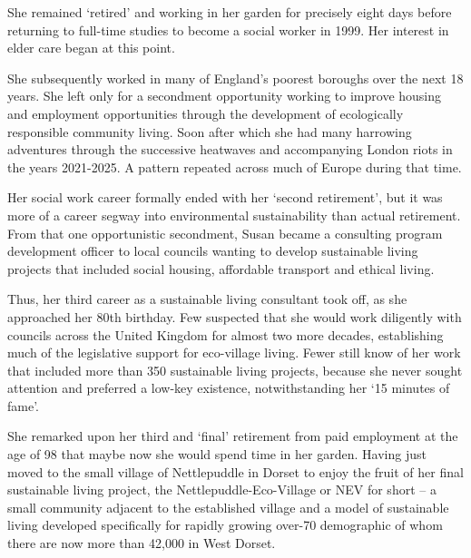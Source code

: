 She remained `retired' and working in her garden for precisely eight days before returning to full-time studies to become a social worker in 1999. Her interest in elder care began at this point.

She subsequently worked in many of England's poorest boroughs over the next 18 years. She left only for a secondment opportunity working to improve housing and employment opportunities through the development of ecologically responsible community living. Soon after which she had many harrowing adventures through the successive heatwaves and accompanying London riots in the years 2021-2025. A pattern repeated across much of Europe during that time.

Her social work career formally ended with her `second retirement', but it was more of a career segway into environmental sustainability than actual retirement. From that one opportunistic secondment, Susan became a consulting program development officer to local councils wanting to develop sustainable living projects that included social housing, affordable transport and ethical living.

Thus, her third career as a sustainable living consultant took off, as she approached her 80th birthday. Few suspected that she would work diligently with councils across the United Kingdom for almost two more decades, establishing much of the legislative support for eco-village living. Fewer still know of her work that included more than 350 sustainable living projects, because she never sought attention and preferred a low-key existence, notwithstanding her `15 minutes of fame'.

She remarked upon her third and `final' retirement from paid employment at the age of 98 that maybe now she would spend time in her garden. Having just moved to the small village of Nettlepuddle in Dorset to enjoy the fruit of her final sustainable living project, the Nettlepuddle-Eco-Village or NEV for short -- a small community adjacent to the established village and a model of sustainable living developed specifically for rapidly growing over-70 demographic of whom there are now more than 42,000 in West Dorset.

